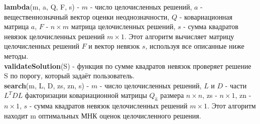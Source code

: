 \documentclass[12pt]{matmex-diploma}
\begin{document}
\textbf{lambda}(m, a, Q, F, s) - $m$ - число целочисленных решений, $a$ - 
вещественнозначный вектор оценки неоднозначности, $Q$ - ковариационная матрица
$a$, $F$ - $n \times m$ матрица целочисленных решений, $s$ - сумма квадратов
невязок целочисленных решений $m \times 1$. Этот алгоритм вычисляет матрицу
целочисленных решений $F$ и вектор невязок $s$, используя все описанные ниже методы. \\

\textbf{validateSolution}(S) - функция по сумме квадратов невязок проверяет решение S
по порогу, который задаёт пользователь.  \\

\textbf{search}(m, L, D, zs, zn, s) - $m$ - число целочисленных решений, $L$ и $D$
- части $L^{T}DL$ факторизации ковариационной матрицы $Q_{\hat{a}}$ размера 
$n \times n$, zs - $n \times 1$, zn - $n \times 1$, $s$ - сумма квадратов невязок
целочисленных решений $m \times 1$. Этот алгоритм находит m оптимальных МНК оценок
целочисленного решения. \\
\end{document}

